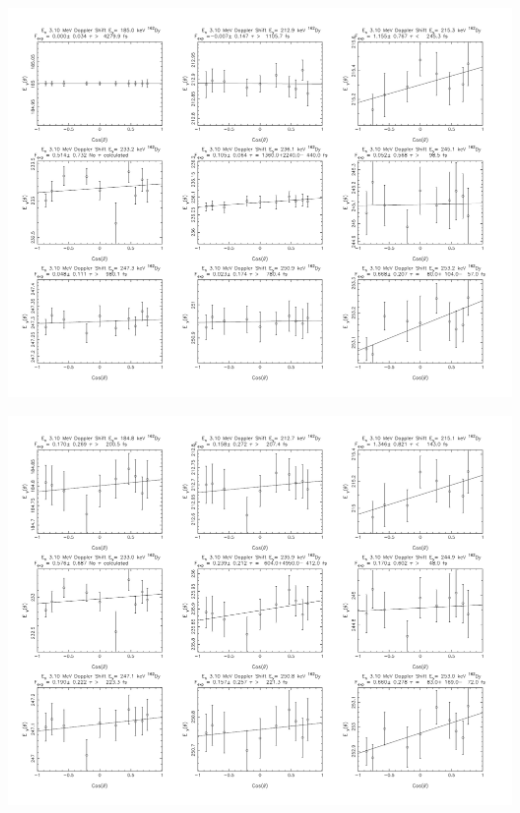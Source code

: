 \begin{center}
\includegraphics[page=17,angle=90,height=0.95\textheight]{162Dy_ftau_310_LE_n.pdf}
\end{center}
\begin{center}
\includegraphics[page=17,angle=90,height=0.95\textheight]{162Dy_ftau_310_ME_n.pdf}
\end{center}
